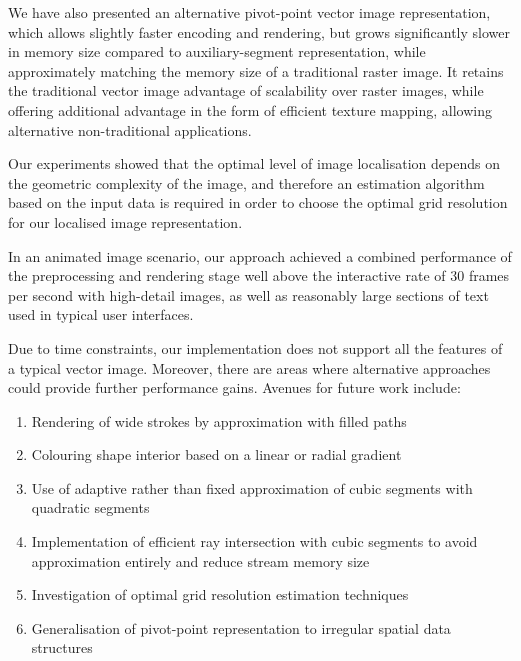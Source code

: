 \documentclass[11pt,a4paper,twoside]{article}
\begin{document}
We have also presented an alternative pivot-point vector image representation, which allows slightly faster encoding and rendering, but grows significantly slower in memory size compared to auxiliary-segment representation, while approximately matching the memory size of a traditional raster image. It retains the traditional vector image advantage of scalability over raster images, while offering additional advantage in the form of efficient texture mapping, allowing alternative non-traditional applications.

Our experiments showed that the optimal level of image localisation depends on the geometric complexity of the image, and therefore an estimation algorithm based on the input data is required in order to choose the optimal grid resolution for our localised image representation.

In an animated image scenario, our approach achieved a combined performance of the preprocessing and rendering stage well above the interactive rate of 30 frames per second with high-detail images, as well as reasonably large sections of text used in typical user interfaces.

Due to time constraints, our implementation does not support all the features of a typical vector image. Moreover, there are areas where alternative approaches could provide further performance gains. Avenues for future work include:

\begin {enumerate}
\item
Rendering of wide strokes by approximation with filled paths
\item
Colouring shape interior based on a linear or radial gradient
\item
Use of adaptive rather than fixed approximation of cubic segments with quadratic segments
\item
Implementation of efficient ray intersection with cubic segments to avoid approximation entirely and reduce stream memory size
\item
Investigation of optimal grid resolution estimation techniques
\item
Generalisation of pivot-point representation to irregular spatial data structures
\end {enumerate}

\newpage

%

\end{document}
